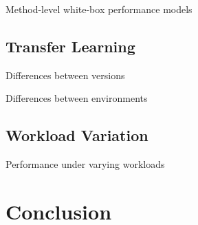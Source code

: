 \documentclass[conference]{IEEEtran}
\begin{document}
Method-level white-box performance models~\cite{weber_white_2021}
\subsection{Transfer Learning}
Differences between versions\cite{muehlbauer_identifying_2020}

Differences between environments~\cite{jamishidi_transfer_2017,jamshidi_learning_2018,jamshidi_transfer_gp_2017,muehlbauer_identifying_2020}
\subsection{Workload Variation}
Performance under varying workloads~\cite{liao_2020_using_emse}
\section{Conclusion}

\clearpage


\end{document}
